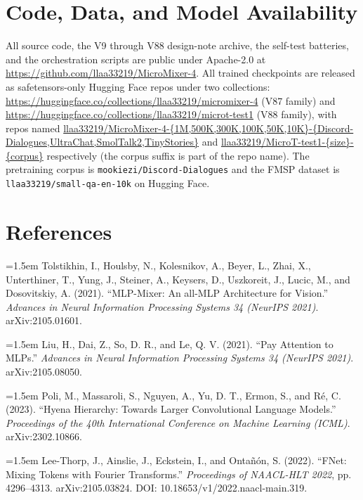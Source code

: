 \documentclass[11pt]{article}
\begin{document}
\section{Code, Data, and Model Availability}

All source code, the V9 through V88 design-note archive, the self-test batteries, and the orchestration scripts are public under Apache-2.0 at \url{https://github.com/llaa33219/MicroMixer-4}. All trained checkpoints are released as safetensors-only Hugging Face repos under two collections: \url{https://huggingface.co/collections/llaa33219/micromixer-4} (V87 family) and \url{https://huggingface.co/collections/llaa33219/microt-test1} (V88 family), with repos named \url{llaa33219/MicroMixer-4-{1M,500K,300K,100K,50K,10K}-{Discord-Dialogues,UltraChat,SmolTalk2,TinyStories}} and \url{llaa33219/MicroT-test1-{size}-{corpus}} respectively (the corpus suffix is part of the repo name). The pretraining corpus is \texttt{mookiezi/Discord-Dialogues} and the FMSP dataset is \texttt{llaa33219/small-qa-en-10k} on Hugging Face.

\section*{References}

\par\hangindent=1.5em
Tolstikhin, I., Houlsby, N., Kolesnikov, A., Beyer, L., Zhai, X., Unterthiner, T., Yung, J., Steiner, A., Keysers, D., Uszkoreit, J., Lucic, M., and Dosovitskiy, A. (2021). ``MLP-Mixer: An all-MLP Architecture for Vision.'' \textit{Advances in Neural Information Processing Systems 34 (NeurIPS 2021)}. arXiv:2105.01601.

\par\hangindent=1.5em
Liu, H., Dai, Z., So, D. R., and Le, Q. V. (2021). ``Pay Attention to MLPs.'' \textit{Advances in Neural Information Processing Systems 34 (NeurIPS 2021)}. arXiv:2105.08050.

\par\hangindent=1.5em
Poli, M., Massaroli, S., Nguyen, A., Yu, D. T., Ermon, S., and R\'e, C. (2023). ``Hyena Hierarchy: Towards Larger Convolutional Language Models.'' \textit{Proceedings of the 40th International Conference on Machine Learning (ICML)}. arXiv:2302.10866.

\par\hangindent=1.5em
Lee-Thorp, J., Ainslie, J., Eckstein, I., and Onta\~n\'on, S. (2022). ``FNet: Mixing Tokens with Fourier Transforms.'' \textit{Proceedings of NAACL-HLT 2022}, pp. 4296--4313. arXiv:2105.03824. DOI: 10.18653/v1/2022.naacl-main.319.
\end{document}
